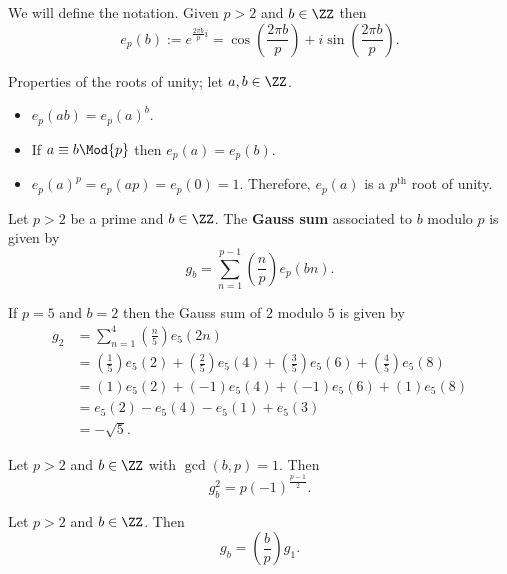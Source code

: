 \documentclass[12pt, a4paper]{article}
\begin{document}
\begin{definition}
    We will define the notation.
    Given \(p>2\) and \(b \in \ZZ\) then
    \[e_p(b) := e^{\frac{2\pi b}{p}i} = \cos\left( \frac{2 \pi b}{p} \right)+i\sin\left( \frac{2\pi b}{p} \right).\]
\end{definition}

\begin{theorem}
    Properties of the roots of unity; let \(a,b \in \ZZ\).
    \begin{itemize}
        \item \(e_p(ab) = e_p(a)^b\).
        \item If \(a \equiv b \Mod{p}\) then \(e_p(a) =e_p(b)\).
        \item \(e_p(a)^p = e_p(ap) =e_p(0) = 1\). Therefore, \(e_p(a)\) is a \(p^{\text{th}}\) root of unity.
    \end{itemize}
\end{theorem}

\begin{definition}
    Let \(p>2\) be a prime and \(b \in \ZZ\). The \textbf{Gauss sum} associated to \(b\) modulo \(p\) is given by
    \[g_b = \sum_{n=1}^{p-1} \left( \frac{n}{p} \right) e_p(bn).\]
\end{definition}

\begin{example}
    If \(p=5\) and \(b=2\) then the Gauss sum of \(2\) modulo \(5\) is given by
    \[\begin{aligned}
        g_2 &= \sum_{n=1}^4 \left( \frac{n}{5} \right)e_5(2n) \\
            &= \left( \frac{1}{5} \right) e_5(2) +\left( \frac{2}{5} \right) e_5(4) +\left( \frac{3}{5} \right) e_5(6)+\left( \frac{4}{5} \right) e_5(8) \\
            &= (1)e_5(2)+ (-1) e_5(4)+ (-1) e_5(6)+ (1) e_5(8) \\
            &= e_5(2)- e_5(4)- e_5(1)+ e_5(3) \\
            &= -\sqrt{5}.
    \end{aligned}\]
\end{example}

\begin{mdprop}
    Let \(p>2\) and \(b \in \ZZ\) with \(\gcd(b,p)=1\). Then 
    \[g_b^2 = p (-1)^{\frac{p-1}{2}}.\]
\end{mdprop}

\begin{lemma}
    Let \(p>2\) and \(b \in \ZZ\). Then
    \[g_b =\left( \frac{b}{p} \right)g_1 .\]
\end{lemma}
\end{document}
